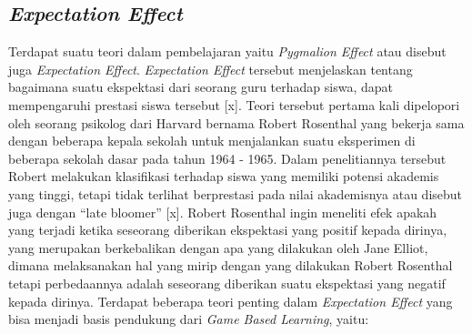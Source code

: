 	
	\subsection{\textit{Expectation Effect}}
	Terdapat suatu teori dalam pembelajaran yaitu \textit{Pygmalion Effect} atau disebut juga \textit{Expectation Effect}. \textit{Expectation Effect} tersebut menjelaskan tentang bagaimana suatu ekspektasi dari seorang guru terhadap siswa, dapat mempengaruhi prestasi siswa tersebut [x]. Teori tersebut pertama kali dipelopori oleh seorang psikolog dari Harvard bernama Robert Rosenthal yang bekerja sama dengan beberapa kepala sekolah untuk menjalankan suatu eksperimen di beberapa sekolah dasar pada tahun  1964 - 1965. Dalam penelitiannya tersebut Robert melakukan klasifikasi terhadap siswa yang memiliki potensi akademis yang tinggi, tetapi tidak terlihat berprestasi pada nilai akademisnya atau disebut juga dengan “late bloomer” [x]. Robert Rosenthal ingin meneliti efek apakah yang terjadi ketika seseorang diberikan ekspektasi yang positif kepada dirinya, yang merupakan berkebalikan dengan apa yang dilakukan oleh Jane Elliot, dimana melaksanakan hal yang mirip dengan yang dilakukan Robert Rosenthal tetapi perbedaannya adalah seseorang diberikan suatu ekspektasi yang negatif kepada dirinya.
	\linebreak \linebreak
	Terdapat beberapa teori penting dalam \textit{Expectation Effect} yang bisa menjadi basis pendukung dari \textit{Game Based Learning}, yaitu:
